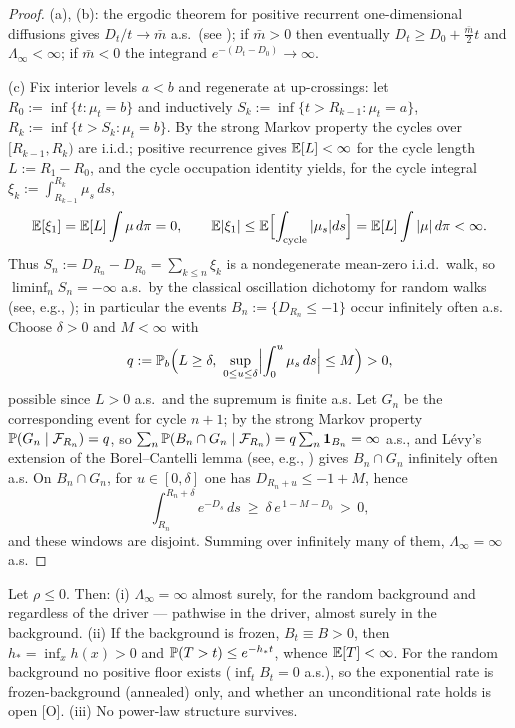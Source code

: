 \begin{proof}
(a), (b): the ergodic theorem for positive recurrent one-dimensional
diffusions gives $D_t/t\to\bar m$ a.s.\ (see \cite[Ch.~X]{RY99}); if
$\bar m>0$ then eventually $D_t\ge D_0+\tfrac{\bar m}2t$ and
$\Lambda_\infty<\infty$; if $\bar m<0$ the integrand
$e^{-(D_t-D_0)}\to\infty$.

(c) Fix interior levels $a<b$ and regenerate at up-crossings: let
$R_0:=\inf\{t:\mu_t=b\}$ and inductively
$S_k:=\inf\{t>R_{k-1}:\mu_t=a\}$, $R_k:=\inf\{t>S_k:\mu_t=b\}$. By the
strong Markov property the cycles over $[R_{k-1},R_k)$ are i.i.d.; positive
recurrence gives $\mathbb{E}[L]<\infty$ for the cycle length
$L:=R_1-R_0$, and the cycle occupation identity yields, for the cycle
integral $\xi_k:=\int_{R_{k-1}}^{R_k}\mu_s\,ds$,
\[
\mathbb{E}[\xi_1]=\mathbb{E}[L]\int\mu\,d\pi=0,\qquad
\mathbb{E}|\xi_1|\le\mathbb{E}\Bigl[\int_{\text{cycle}}|\mu_s|ds\Bigr]
=\mathbb{E}[L]\int|\mu|\,d\pi<\infty .
\]
Thus $S_n:=D_{R_n}-D_{R_0}=\sum_{k\le n}\xi_k$ is a nondegenerate mean-zero
i.i.d.\ walk, so $\liminf_nS_n=-\infty$ a.s.\ by the classical
oscillation dichotomy for random walks (see, e.g., \cite{Dur19});
in particular the events $B_n:=\{D_{R_n}\le-1\}$ occur infinitely often
a.s. Choose $\delta>0$ and $M<\infty$ with
\[
q:=\mathbb{P}_b\Bigl(L\ge\delta,\ \sup_{0\le u\le\delta}
\Bigl|\int_0^u\mu_s\,ds\Bigr|\le M\Bigr)>0,
\]
possible since $L>0$ a.s.\ and the supremum is finite a.s. Let
$G_n$ be the corresponding event for cycle $n{+}1$; by the strong Markov
property $\mathbb{P}(G_n\mid\mathcal{F}_{R_n})=q$, so
$\sum_n\mathbb{P}(B_n\cap G_n\mid\mathcal{F}_{R_n})=q\sum_n\mathbf{1}_{B_n}=\infty$ a.s., and
L\'evy's extension of the Borel--Cantelli lemma (see, e.g.,
\cite{Dur19}) gives
$B_n\cap G_n$ infinitely often a.s. On $B_n\cap G_n$, for
$u\in[0,\delta]$ one has $D_{R_n+u}\le-1+M$, hence
\[
\int_{R_n}^{R_n+\delta}e^{-D_s}\,ds\ \ge\ \delta\,e^{\,1-M-D_0}\,>\,0 ,
\]
and these windows are disjoint. Summing over infinitely many of them,
$\Lambda_\infty=\infty$ a.s.
\end{proof}

\begin{theorem}
\label{thm:trapped}
Let $\rho\le0$. Then: (i) $\Lambda_\infty=\infty$ almost surely, for
the random background and regardless of the driver --- pathwise in the
driver, almost surely in the background. (ii) If the background is
frozen, $B_t\equiv B>0$, then $h_\ast=\inf_xh(x)>0$ and
$\mathbb{P}(T>t)\le e^{-h_\ast t}$, whence $\mathbb{E}[T]<\infty$. For the random
background no positive floor exists ($\inf_tB_t=0$ a.s.), so the
exponential rate is frozen-background (annealed) only, and whether an
unconditional rate holds is open [O]. (iii) No power-law structure
survives.
\end{theorem}

